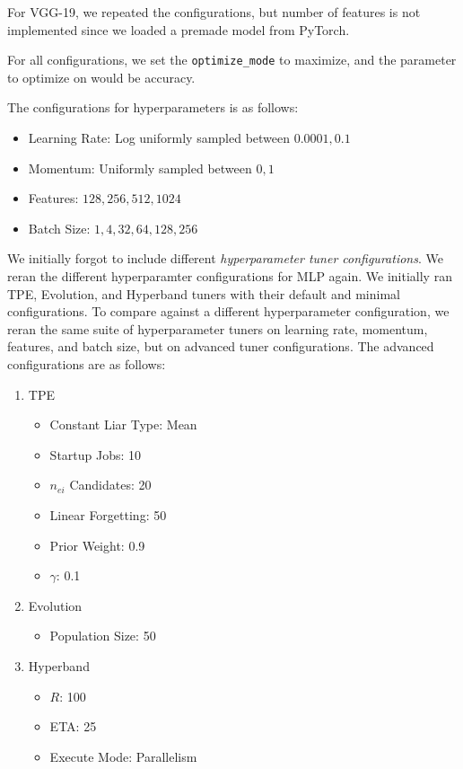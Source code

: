 \documentclass{article}
\begin{document}
For VGG-19, we repeated the configurations, but number of features is not implemented since we loaded a premade model from PyTorch.

For all configurations, we set the \verb|optimize_mode| to maximize, and the parameter to optimize on would be accuracy. 

The configurations for hyperparameters is as follows:
\begin{itemize}
    \item Learning Rate: Log uniformly sampled between $0.0001, 0.1$
    \item Momentum: Uniformly sampled between $0, 1$
    \item Features: $128, 256, 512, 1024$
    \item Batch Size: $1, 4, 32, 64, 128, 256$
\end{itemize}

We initially forgot to include different \textit{hyperparameter tuner configurations}. We reran the different hyperparamter configurations for MLP again. We initially ran TPE, Evolution, and Hyperband tuners with their default and minimal configurations. To compare against a different hyperparameter configuration, we reran the same suite of hyperparameter tuners on learning rate, momentum, features, and batch size, but on advanced tuner configurations. The advanced configurations are as follows:

\begin{enumerate}
    \item TPE
        \begin{itemize}
            \item Constant Liar Type: Mean
            \item Startup Jobs: 10
            \item $n_{ei}$ Candidates: 20
            \item Linear Forgetting: 50
            \item Prior Weight: 0.9
            \item $\gamma$: 0.1
        \end{itemize}
    \item Evolution
        \begin{itemize}
            \item Population Size: 50
        \end{itemize}
    \item Hyperband
        \begin{itemize}
            \item $R$: 100
            \item ETA: 25
            \item Execute Mode: Parallelism
        \end{itemize}
\end{enumerate}
\end{document}
